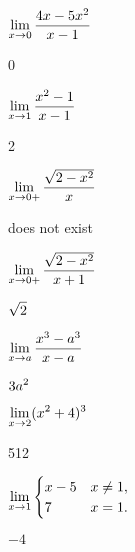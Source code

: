\begin{exercises}
\begin{exercise} $\displaystyle \lim _{x\to 0 } {4x - 5x^2\over x-1}$
\begin{answer} 0
\end{answer}\end{exercise}

\begin{exercise} $\displaystyle\lim _{x\to 1 } {x^2 -1 \over x-1 }$
\begin{answer} 2
\end{answer}\end{exercise}

\begin{exercise} $\displaystyle\lim _{x\to 0 + } {\sqrt{2-x^2 }\over x}$
\begin{answer} does not exist
\end{answer}\end{exercise}

\begin{exercise} $\displaystyle\lim _{x\to 0 + } {\sqrt{2-x^2}\over x+1}$
\begin{answer} $\displaystyle \sqrt2$
\end{answer}\end{exercise}

\begin{exercise} $\displaystyle\lim _{x\to a } {x^3 -a^3\over x-a}$
\begin{answer} $\displaystyle 3a^2$
\end{answer}\end{exercise}

\begin{exercise} $\displaystyle\lim _{x\to 2 } (x^2 +4)^3$
\begin{answer} 512
\end{answer}\end{exercise}

\begin{exercise} $\displaystyle\lim _{x\to 1 } \begin{cases}
x-5 & x\ne 1, \\
7 & x=1. \end{cases}$
\begin{answer} $-4$
\end{answer}\end{exercise}

\endtwocol

\end{exercises}


